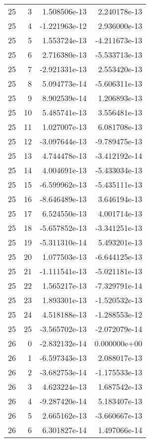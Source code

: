 \begin{tabular}{rrrr}
  25 &    3 &  1.508506e-13 &  2.240178e-13 \\
  25 &    4 & -1.221963e-12 &  2.936000e-13 \\
  25 &    5 &  1.553724e-13 & -4.211673e-13 \\
  25 &    6 &  2.716380e-13 & -5.533713e-13 \\
  25 &    7 & -2.921331e-13 &  2.553420e-13 \\
  25 &    8 &  5.094773e-14 & -5.606311e-13 \\
  25 &    9 &  8.902539e-14 &  1.206893e-13 \\
  25 &   10 &  5.485741e-13 &  3.556481e-13 \\
  25 &   11 &  1.027007e-13 &  6.081708e-13 \\
  25 &   12 & -3.097644e-13 & -9.789475e-13 \\
  25 &   13 &  4.744478e-13 & -3.412192e-14 \\
  25 &   14 &  4.004691e-13 & -5.433034e-13 \\
  25 &   15 & -6.599962e-13 & -5.435111e-13 \\
  25 &   16 & -8.646489e-13 &  3.646194e-13 \\
  25 &   17 &  6.524550e-13 &  4.001714e-13 \\
  25 &   18 & -5.657852e-13 & -3.341251e-13 \\
  25 &   19 & -5.311310e-14 &  5.493201e-13 \\
  25 &   20 &  1.077503e-13 & -6.644125e-13 \\
  25 &   21 & -1.111541e-13 & -5.021181e-13 \\
  25 &   22 &  1.565217e-13 & -7.329791e-14 \\
  25 &   23 &  1.893301e-13 & -1.520532e-13 \\
  25 &   24 &  4.518188e-13 & -1.288553e-12 \\
  25 &   25 & -3.565702e-13 & -2.072079e-14 \\
  26 &    0 & -2.832132e-14 &  0.000000e+00 \\
  26 &    1 & -6.597343e-13 &  2.088017e-13 \\
  26 &    2 & -3.682753e-14 & -1.175533e-13 \\
  26 &    3 &  4.623224e-13 &  1.687542e-13 \\
  26 &    4 & -9.287420e-14 &  5.183407e-13 \\
  26 &    5 &  2.665162e-13 & -3.660667e-13 \\
  26 &    6 &  6.301827e-14 &  1.497066e-14 \\

\end{tabular}
